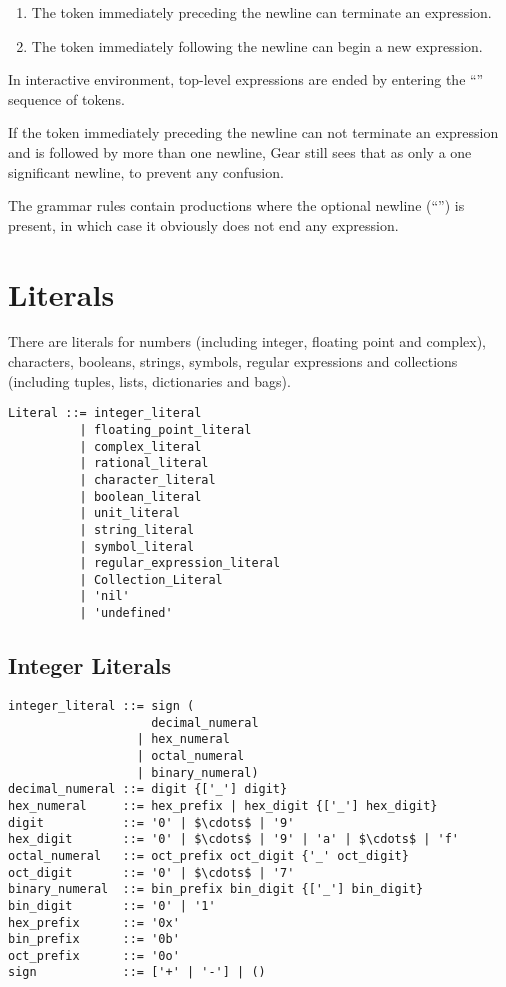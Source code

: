\begin{enumerate}
  \item The token immediately preceding the newline can terminate an expression.
  \item The token immediately following the newline can begin a new expression. 
\end{enumerate}

In interactive environment, top-level expressions are ended by entering the ``\code{;;}'' sequence of tokens. 

If the token immediately preceding the newline can not terminate an expression and is followed by more than one newline, Gear still sees that as only a one significant newline, to prevent any confusion.

The grammar rules contain productions where the optional newline (``\code{[nl]}'') is present, in which case it obviously does not end any expression. 






\section{Literals}
\label{sec:literals}

There are literals for numbers (including integer, floating point and complex), characters, booleans, strings, symbols, regular expressions and collections (including tuples, lists, dictionaries and bags). 

\syntax\begin{lstlisting}
Literal ::= integer_literal
	      | floating_point_literal
	      | complex_literal
	      | rational_literal
	      | character_literal
	      | boolean_literal
	      | unit_literal
	      | string_literal
	      | symbol_literal
	      | regular_expression_literal
	      | Collection_Literal
	      | 'nil'
	      | 'undefined'
\end{lstlisting}






\subsection{Integer Literals}\label{sec:integerliterals}

\syntax\begin{lstlisting}
integer_literal ::= sign (
                    decimal_numeral
                  | hex_numeral
                  | octal_numeral
                  | binary_numeral)
decimal_numeral ::= digit {['_'] digit}
hex_numeral     ::= hex_prefix | hex_digit {['_'] hex_digit}
digit           ::= '0' | $\cdots$ | '9'
hex_digit       ::= '0' | $\cdots$ | '9' | 'a' | $\cdots$ | 'f'
octal_numeral   ::= oct_prefix oct_digit {'_' oct_digit}
oct_digit       ::= '0' | $\cdots$ | '7'
binary_numeral  ::= bin_prefix bin_digit {['_'] bin_digit}
bin_digit       ::= '0' | '1'
hex_prefix      ::= '0x'
bin_prefix      ::= '0b'
oct_prefix      ::= '0o'
sign            ::= ['+' | '-'] | ()
\end{lstlisting}

